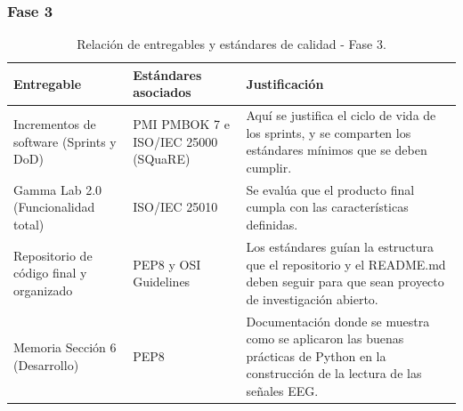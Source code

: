 \documentclass[12pt,letterpaper]{article}
\begin{document}
\subsubsection{Fase 3}
\begin{table}[H]
\small
\centering
\renewcommand{\arraystretch}{1.4}
\begin{tabularx}{\textwidth}{|>{\hsize=0.7\hsize}X|>{\hsize=0.8\hsize}X|>{\hsize=1.5\hsize}X|}
\hline
\textbf{Entregable} & \textbf{Estándares asociados} & \textbf{Justificación} \\ \hline
Incrementos de software (Sprints y DoD) & PMI PMBOK 7 e ISO/IEC 25000 (SQuaRE) & Aquí se justifica el ciclo de vida de los sprints, y se comparten los estándares mínimos que se deben cumplir. \\ \hline

Gamma Lab 2.0 (Funcionalidad total) & ISO/IEC 25010 & Se evalúa que el producto final cumpla con las características definidas. \\ \hline

Repositorio de código final y organizado & PEP8 y OSI Guidelines & Los estándares guían la estructura que el repositorio y el README.md deben seguir para que sean proyecto de investigación abierto. \\ \hline

Memoria Sección 6 (Desarrollo) & PEP8 & Documentación donde se muestra como se aplicaron las buenas prácticas de Python en la construcción de la lectura de las señales EEG. \\ \hline
\end{tabularx}
\caption{Relación de entregables y estándares de calidad - Fase 3.}
\end{table}

\end{document}
